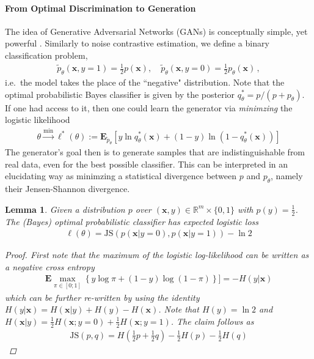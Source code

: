 \documentclass{article}
\renewcommand{\Re}{{\mathbb R}}
\newcommand{\E}{{\mathbf E}}
\newcommand{\x}{{\mathbf x}}
\newtheorem{lemma}{Lemma}
\begin{document}
\paragraph{From Optimal Discrimination to Generation}

The idea of Generative Adversarial Networks (GANs) is conceptually simple, yet powerful \cite{goodfellow2014generative}. Similarly to noise contrastive estimation, we define a binary classification problem,
\begin{align} 
\tilde p_\theta(\x, y=1) = \tfrac 12 p(\x), \quad \tilde p_\theta(\x,y=0) = \tfrac 12 p_\theta(\x) \,,
\end{align}
i.e.~the model takes the place of the ``negative" distribution. Note that the optimal probabilistic Bayes classifier is given by the posterior $q^*_\theta = p/ (p +p_\theta)$.
If one had access to it, then one could learn the generator via \textit{minimzing} the logistic likelihood 
\begin{align}
\theta \stackrel{\min}{\longrightarrow} \ell^*(\theta):= \E_{\tilde p_\theta} \left[ y \ln q^*_\theta(\x) + (1-y) \ln(1-q^*_\theta(\x))\right] 
\label{eq:optimal}
\end{align}
The generator's goal then is to generate samples that are indistinguishable from real data, even for the best possible classifier. This can be interpreted in an elucidating way as minimzing a statistical divergence between $p$ and $p_\theta$, namely their Jensen-Shannon divergence.
\begin{lemma}
Given a distribution $p$ over $(\x,y) \in \Re^m \times \{0,1\}$ with $p(y)=\tfrac 12$. The (Bayes) optimal probabilistic classifier has expected logistic loss 
\begin{align}
\ell(\theta)  = \text{JS}(p(\x|y=0),p(\x|y=1)) - \ln 2
 \nonumber
\end{align}
\begin{proof}
First note that the maximum of the logistic log-likelihood can be written as a negative cross entropy 
\begin{align*}
\E\max_{\pi \in  [0;1]} \left\{ y \log \pi + (1-y) \log (1-\pi) \right\} ]= - H(y|\x)
\end{align*}
which can be further re-written by using the identity $H(y|\x)= H(\x|y) +H(y)  - H(\x)$. Note that $H(y) = \ln 2$ and $H(\x|y) = \frac 12 H(\x; y=0) + \frac 12 H(\x;y=1)$. The claim follows as 
\begin{align*}
\text{JS}(p,q) = H(\tfrac 12 p + \tfrac 12 q) - \tfrac 12  H(p) - \tfrac 12 H(q)
\end{align*} 
\end{proof}
\end{lemma}
\end{document}
